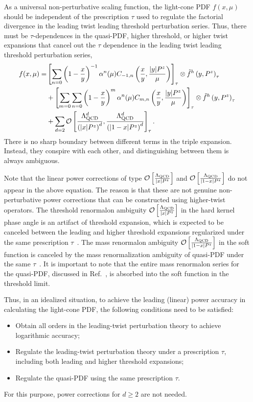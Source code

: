 \documentclass[a4paper,11pt]{article}
\begin{document}
As a universal non-perturbative scaling function, the light-cone PDF $f(x,\mu)$ should be independent of the prescription $\tau$ used to regulate the factorial divergence in the leading twist leading threshold perturbation series. Thus, there must be $\tau$-dependences in the quasi-PDF, higher threshold, or higher twist expansions that cancel out the $\tau$ dependence in the leading twist leading threshold perturbation series,
\begin{align}\label{eq:OPEtritau}
    f(x,\mu)  = & \left[\sum_{n=0} \left(1-\frac{x}{y}\right)^{-1} \alpha^n(\mu) C_{-1,n}\left( \frac{x}{y}, \frac{|y| P^z}{\mu} \right) \right]_{\tau} \otimes \tilde f^{h} \left(y, P^z\right)_{\tau} \nonumber\\
    &+ \left[ \sum_{m=0} \sum_{n=0} \left(1-\frac{x}{y}\right)^{m} \alpha^n(\mu) C_{m,n}\left( \frac{x}{y}, \frac{|y| P^z}{\mu} \right) \right]_{\tau} \otimes \tilde f^{h} \left(y, P^z\right)_{\tau} \nonumber\\
    &+ \sum_{d=2} \mathcal{O}\left[ \frac{\Lambda_{\rm QCD}^d}{\left(|x| P^z\right)^d} , \frac{\Lambda_{\rm QCD}^d}{\left(|1-x| P^z\right)^d} \right]_{\tau} .
\end{align}
There is no sharp boundary between different terms in the triple expansion. Instead, they conspire with each other, and distinguishing between them is always ambiguous.

Note that the linear power corrections of type $\mathcal{O}\left[ \frac{\Lambda_{\rm QCD}}{|x| P^z} \right]$ and $\mathcal{O}\left[ \frac{\Lambda_{\rm QCD}}{|1-x| P^z} \right]$ do not appear in the above equation. The reason is that these are not genuine non-perturbative power corrections that can be constructed using higher-twist operators. The threshold renormalon ambiguity $\mathcal{O}\left[ \frac{\Lambda_{\rm QCD}}{|x| P^z} \right]$ in the hard kernel phase angle is an artifact of threshold expansion, which is expected to be canceled between the leading and higher threshold expansions regularized under the same prescription $\tau$~\cite{Liu:2023onm}. The mass renormalon ambiguity $\mathcal{O}\left[ \frac{\Lambda_{\rm QCD}}{|1-x| P^z} \right]$ in the soft function is canceled by the mass renormalization ambiguity of quasi-PDF under the same $\tau$~\cite{Braun:2018brg,Zhang:2023bxs}. It is important to note that the entire mass renormalon series for the quasi-PDF, discussed in Ref.~\cite{Zhang:2023bxs}, is absorbed into the soft function in the threshold limit. 

Thus, in an idealized situation, to achieve the leading (linear) power accuracy in calculating the light-cone PDF, the following conditions need to be satisfied:
\begin{itemize}
\item Obtain all orders in the leading-twist perturbation theory to achieve logarithmic accuracy;
\item Regulate the leading-twist perturbation theory under a prescription $\tau$, including both leading and higher threshold expansions;
\item Regulate the quasi-PDF using the same prescription $\tau$.
\end{itemize}
For this purpose, power corrections for $d \geq 2$ are not needed. 
\end{document}
